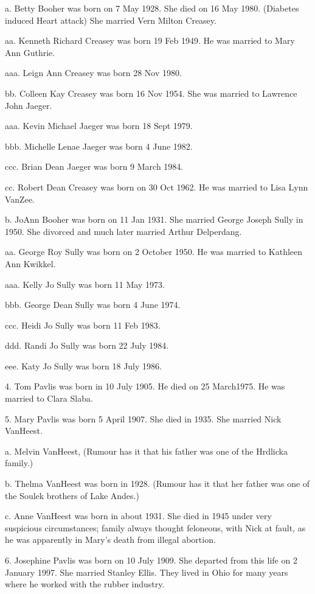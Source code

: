 \documentclass[a4paper]{article}
\begin{document}
a. Betty Booher was  born on 7 May 1928.  She died on 16 May 1980. (Diabetes induced  Heart attack)  She married Vern Milton Creasey.

aa. Kenneth Richard Creasey was born 19 Feb 1949.  He was married to Mary Ann Guthrie.

aaa. Leign Ann Creasey was born 28 Nov 1980.

bb. Colleen Kay Creasey was born 16 Nov 1954.  She was married to Lawrence John Jaeger.

aaa. Kevin Michael Jaeger was born 18 Sept 1979.

bbb. Michelle Lenae Jaeger was born 4 June 1982.

ccc. Brian Dean Jaeger was born 9 March 1984.
					
cc. Robert Dean Creasey was born on 30 Oct 1962.  He was married to Lisa Lynn VanZee.

b. JoAnn Booher was born on 11 Jan 1931.  She married George Joseph Sully in 1950.  She divorced and much later married Arthur Delperdang.

aa. George Roy Sully was born on 2 October 1950.  He was married to Kathleen Ann Kwikkel.

aaa. Kelly Jo Sully was born 11 May 1973.

bbb. George Dean Sully was born 4 June 1974.

ccc. Heidi Jo Sully was born 11 Feb 1983.  

ddd. Randi Jo Sully was born 22 July 1984.

eee. Katy Jo Sully was born 18 July 1986.

4. Tom Pavlis was born in 10 July 1905.  He died on 25 March1975.  He was married to	Clara Slaba.   

5. Mary Pavlis was born 5 April 1907.  She died in 1935.  She married Nick VanHeest. 
 
a.  Melvin VanHeest, (Rumour has it that his father was one of the Hrdlicka family.)  

b. Thelma VanHeest was born in 1928. (Rumour has it that her father was one of the Soulek brothers of Lake Andes.)

c. Anne VanHeest was born in about 1931.  She died in 1945 under very suspicious circumstances; family  always thought feloneous, with Nick at fault, as he was apparently in Mary's death from illegal abortion.   

6. Josephine Pavlis was born on 10 July 1909. She departed from this life on 2 January 1997.  She married Stanley Ellis.  They lived in Ohio for many  years where he worked with the rubber industry. 
\end{document}
